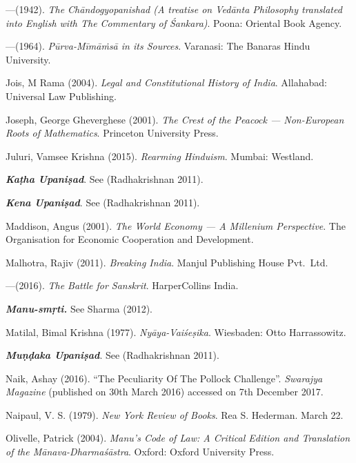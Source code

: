 \begin{thebibliography}{99}
---\kern3pt(1942). {\sl The Chāndogyopanishad (A treatise on Vedānta Philosophy translated into English with The Commentary of Śankara)}. Poona: Oriental Book Agency.

---\kern3pt(1964). {\sl Pūrva-Mīmāṁsā in its Sources}. Varanasi: The Banaras Hindu University.

Jois, M Rama (2004). {\sl Legal and Constitutional History of India}. Allahabad: Universal Law Publishing.

Joseph, George Gheverghese (2001). {\sl The Crest of the Peacock --- Non-European Roots of Mathematics}. Princeton University Press.

Juluri, Vamsee Krishna (2015). {\sl Rearming Hinduism}. Mumbai: Westland.

{{\sl\bfseries Kaṭha Upaniṣad}}. See (Radhakrishnan 2011).

{{\sl\bfseries Kena Upaniṣad}}. See (Radhakrishnan 2011).

Maddison, Angus (2001). {\sl The World Economy --- A Millenium Perspective}. The Organisation for Economic Cooperation and Development.

Malhotra, Rajiv (2011). {\sl Breaking India}. Manjul Publishing House Pvt.\ Ltd.

---\kern3pt(2016). {\sl The Battle for Sanskrit}. HarperCollins India.

{{\sl\bfseries Manu-smṛti.}} See Sharma (2012).

Matilal, Bimal Krishna (1977). {\sl Nyāya-Vaiśeṣika}. Wiesbaden: Otto Harrassowitz.

{{\sl\bfseries Muṇḍaka Upaniṣad}}. See (Radhakrishnan 2011).

Naik, Ashay (2016). ``The Peculiarity Of The Pollock Challenge''. {\sl Swarajya Magazine} 
(published on 30th March 2016) accessed on 7th December 2017.

Naipaul, V. S. (1979). {\sl New York Review of Books}. Rea S. Hederman. March 22.

Olivelle, Patrick (2004). {\sl Manu’s Code of Law: A Critical Edition and Translation of the Mānava-Dharmaśāstra}. Oxford: Oxford University Press.


\end{thebibliography}
